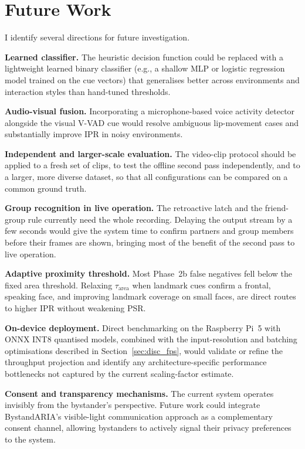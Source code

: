\section{Future Work}
\label{sec:conclusion_future}

I identify several directions for future investigation.

\textbf{Learned classifier.} The heuristic decision function could be replaced with
a lightweight learned binary classifier (e.g., a shallow MLP or logistic regression
model trained on the cue vectors) that generalises better across environments and
interaction styles than hand-tuned thresholds.

\textbf{Audio-visual fusion.} Incorporating a microphone-based voice activity
detector alongside the visual V-VAD cue would resolve ambiguous lip-movement cases
and substantially improve IPR in noisy environments.

\textbf{Independent and larger-scale evaluation.} The video-clip protocol should
be applied to a fresh set of clips, to test the offline second pass independently,
and to a larger, more diverse dataset, so that all configurations can be compared on
a common ground truth.

\textbf{Group recognition in live operation.} The retroactive latch and the
friend-group rule currently need the whole recording. Delaying the output stream
by a few seconds would give the system time to confirm partners and group members
before their frames are shown, bringing most of the benefit of the second pass to
live operation.

\textbf{Adaptive proximity threshold.} Most Phase~2b false negatives fell below the
fixed area threshold. Relaxing $\tau_{\mathrm{area}}$ when landmark cues confirm a
frontal, speaking face, and improving landmark coverage on small faces, are
direct routes to higher IPR without weakening PSR.

\textbf{On-device deployment.} Direct benchmarking on the Raspberry Pi~5 with ONNX
INT8 quantised models, combined with the input-resolution and batching optimisations
described in Section~\ref{sec:disc_fps}, would validate or refine the throughput projection and
identify any architecture-specific performance bottlenecks not captured by the
current scaling-factor estimate.

\textbf{Consent and transparency mechanisms.} The current system operates
invisibly from the bystander's perspective. Future work could integrate BystandARIA's
visible-light communication approach \citep{ref:bystandaria} as a complementary
consent channel, allowing bystanders to actively signal their privacy preferences
to the system.
